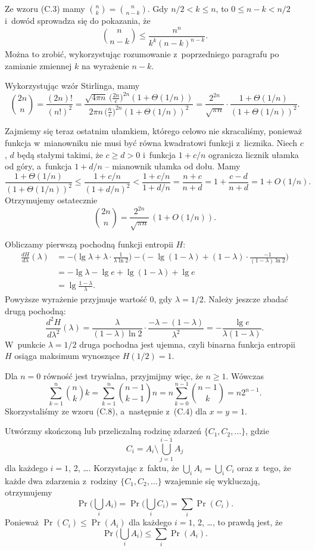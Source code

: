 Ze wzoru (C.3) mamy $\binom{n}{k}=\binom{n}{n-k}$.
Gdy $n/2<k\le n$, to $0\le n-k<n/2$ i~dowód sprowadza się do pokazania, że
\[
	\binom{n}{n-k} \le \frac{n^n}{k^k(n-k)^{n-k}}.
\]
Można to zrobić, wykorzystując rozumowanie z~poprzedniego paragrafu po zamianie zmiennej $k$ na wyrażenie $n-k$.

\exercise %
Wykorzystując wzór Stirlinga, mamy
\[
	\binom{2n}{n} = \frac{(2n)!}{(n!)^2} = \frac{\sqrt{4\pi n}\,\bigl(\frac{2n}{e}\bigr)^{2n}(1+\Theta(1/n))}{2\pi n\,\bigl(\frac{n}{e}\bigr)^{2n}(1+\Theta(1/n))^2} = \frac{2^{2n}}{\sqrt{\pi n}}\cdot\frac{1+\Theta(1/n)}{(1+\Theta(1/n))^2}.
\]

Zajmiemy się teraz ostatnim ułamkiem, którego celowo nie skracaliśmy, ponieważ funkcja w~mianowniku nie musi być równa kwadratowi funkcji z~licznika.
Niech $c$, $d$ będą stałymi takimi, że $c\ge d>0$ i~funkcja $1+c/n$ ogranicza licznik ułamka od góry, a~funkcja $1+d/n$ -- mianownik ułamka od dołu.
Mamy
\[
    \frac{1+\Theta(1/n)}{(1+\Theta(1/n))^2} \le \frac{1+c/n}{(1+d/n)^2} < \frac{1+c/n}{1+d/n} = \frac{n+c}{n+d} = 1+\frac{c-d}{n+d} = 1+O(1/n).
\]
Otrzymujemy ostatecznie
\[
    \binom{2n}{n} = \frac{2^{2n}}{\sqrt{\pi n}}\,(1+O(1/n)).
\]

\exercise %
Obliczamy pierwszą pochodną funkcji entropii $H$:
\begin{align*}
    \frac{dH}{d\lambda}(\lambda) &= -\biggl(\lg\lambda+\lambda\cdot\frac{1}{\lambda\ln2}\biggr)-\biggl(-\lg(1-\lambda)+(1-\lambda)\cdot\frac{-1}{(1-\lambda)\ln2}\biggr) \\[1mm]
	&= -\lg\lambda-\lg e+\lg(1-\lambda)+\lg e \\[1mm]
	&= \lg\frac{1-\lambda}{\lambda}.
\end{align*}
Powyższe wyrażenie przyjmuje wartość 0, gdy $\lambda=1/2$.
Należy jeszcze zbadać drugą pochodną:
\[
	\frac{d^2\!H}{d\lambda^2}(\lambda) = \frac{\lambda}{(1-\lambda)\ln2}\cdot\frac{-\lambda-(1-\lambda)}{\lambda^2} = -\frac{\lg e}{\lambda(1-\lambda)}.
\]
W~punkcie $\lambda=1/2$ druga pochodna jest ujemna, czyli binarna funkcja entropii $H$ osiąga maksimum wynoszące $H(1/2)=1$.

\exercise %
Dla $n=0$ równość jest trywialna, przyjmijmy więc, że $n\ge1$.
Wówczas
\[
	\sum_{k=1}^n\binom{n}{k}k = \sum_{k=1}^n\binom{n-1}{k-1}n = n\sum_{k=0}^{n-1}\binom{n-1}{k} = n2^{n-1}.
\]
Skorzystaliśmy ze wzoru (C.8), a~następnie z~(C.4) dla $x=y=1$.


\exercise %
Utwórzmy skończoną lub przeliczalną rodzinę zdarzeń $\{C_1,C_2,\dots\}$, gdzie
\[
	C_i = A_i\setminus\bigcup_{j=1}^{i-1}A_j
\]
dla każdego $i=1$, 2, \dots.
Korzystając z~faktu, że $\bigcup_iA_i = \bigcup_iC_i$ oraz z~tego, że każde dwa zdarzenia z~rodziny $\{C_1,C_2,\dots\}$ wzajemnie się wykluczają, otrzymujemy
\[
	\Pr\biggl(\bigcup_iA_i\biggr) = \Pr\biggl(\bigcup_iC_i\biggr) = \sum_i\Pr(C_i).
\]
Ponieważ $\Pr(C_i)\le\Pr(A_i)$ dla każdego $i=1$, 2, \dots, to prawdą jest, że
\[
	\Pr\biggl(\bigcup_iA_i\biggr) \le \sum_i\Pr(A_i).
\]

